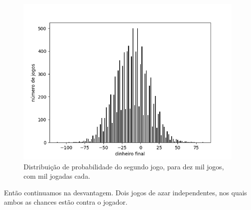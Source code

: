 \documentclass[12pt]{article}
\begin{document}
\begin{figure}[H]
\centering
\includegraphics[scale=0.8]{graph8.png}
\caption{Distribuição de probabilidade do segundo jogo, para dez mil jogos, com mil jogadas cada.}
\end{figure}

Então continuamos na desvantagem. Dois jogos de azar independentes, nos quais ambos as chances estão contra o jogador.
\end{document}
